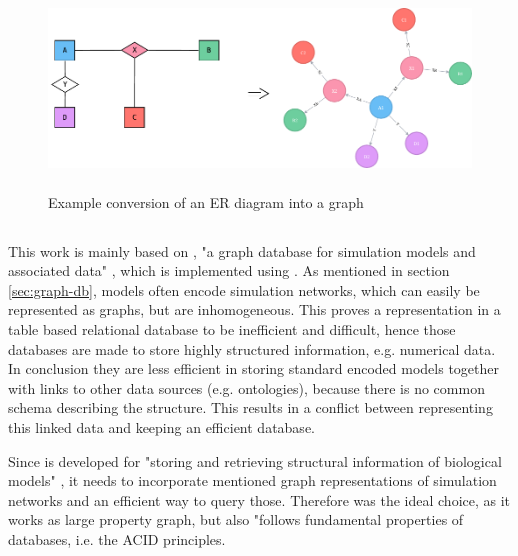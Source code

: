 \begin{figure}
	\center
	\includegraphics[height=150pt]{resources/er-to-neo4j.pdf}
	\caption{Example conversion of an ER diagram into a \neoj graph}
	
	
	\label{fig:example-er-diagram}
\end{figure}

\subsection{\masymos}
\label{sec:background:graph-db:masymos}

This work is mainly based on \masymos, "a graph database for simulation models and associated data" \cite{Henkel2015}, which is implemented using \neoj {}.
As mentioned in section \ref{sec:graph-db}, models often encode simulation networks, which can easily be represented as graphs, but are inhomogeneous. This proves a representation in a table based relational database to be inefficient and difficult, hence those databases are made to store highly structured information, e.g. numerical data. In conclusion they are less efficient in storing standard encoded models together with links to other data sources (e.g. ontologies), because there is no common schema describing the structure. This results in a conflict between representing this linked data and keeping an efficient database.

Since \masymos is developed for "storing and retrieving structural information of biological models" \cite{Henkel2015}, it needs to incorporate mentioned graph representations of simulation networks and an efficient way to query those. Therefore \neoj was the ideal choice, as it works as large property graph, but also "follows fundamental properties of databases, i.e. the ACID principles. \cite{Henkel2015}

